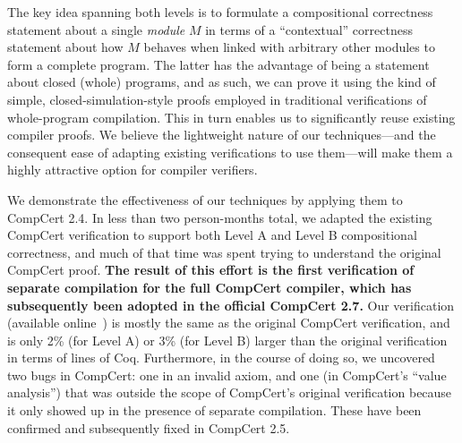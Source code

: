 The key idea spanning both levels is to formulate a compositional correctness statement about a
single \emph{module} $M$ in terms of a ``contextual'' correctness statement about how $M$ behaves
when linked with arbitrary other modules to form a complete program.  The latter has the advantage
of being a statement about closed (whole) programs, and as such, we can prove it using the kind of
simple, closed-simulation-style proofs employed in traditional verifications of whole-program
compilation.  This in turn enables us to significantly reuse existing compiler proofs.  We believe
the lightweight nature of our techniques---and the consequent ease of adapting existing
verifications to use them---will make them a highly attractive option for compiler verifiers.

We demonstrate the effectiveness of our techniques by applying them to CompCert 2.4.  In less than
two person-months total, we adapted the existing CompCert verification to support both Level A and
Level B compositional correctness, and much of that time was spent trying to understand the original
CompCert proof.  \textbf{The result of this effort is the first verification of separate compilation
  for the full CompCert compiler, which has subsequently been adopted in the official CompCert 2.7.}
Our verification (available online~\cite{kang-phd-thesis-web}) is mostly the same as the original
CompCert verification, and is only 2\% (for Level A) or 3\% (for Level B) larger than the original
verification in terms of lines of Coq.  Furthermore, in the course of doing so, we uncovered two
bugs in CompCert: one in an invalid axiom, and one (in CompCert's ``value analysis'') that was
outside the scope of CompCert's original verification because it only showed up in the presence of
separate compilation.  These have been confirmed and subsequently fixed in CompCert 2.5.




